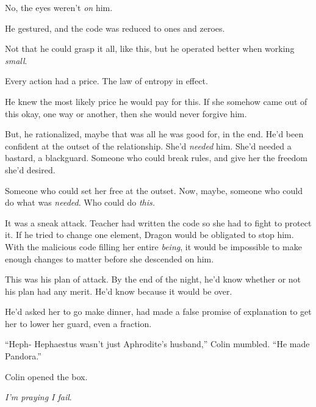 No, the eyes weren't \emph{on} him.



He gestured, and the code was reduced to ones and zeroes.



Not that he could grasp it all, like this, but he operated better when working \emph{small}.



Every action had a price.  The law of entropy in effect.



He knew the most likely price he would pay for this.  If she somehow came out of this okay, one way or another, then she would never forgive him.



But, he rationalized, maybe that was all he was good for, in the end.  He'd been confident at the outset of the relationship.  She'd \emph{needed} him.  She'd needed a bastard, a blackguard.  Someone who could break rules, and give her the freedom she'd desired.



Someone who could set her free at the outset.  Now, maybe, someone who could do what was \emph{needed}.  Who could do \emph{this.}



It was a sneak attack.  Teacher had written the code so she had to fight to protect it.  If he tried to change one element, Dragon would be obligated to stop him.  With the malicious code filling her entire \emph{being}, it would be impossible to make enough changes to matter before she descended on him.



This was his plan of attack.  By the end of the night, he'd know whether or not his plan had any merit.  He'd know because it would be over.



He'd asked her to go make dinner, had made a false promise of explanation to get her to lower her guard, even a fraction.



``Heph- Hephaestus wasn't just Aphrodite's husband,'' Colin mumbled.  ``He made Pandora.''



Colin opened the box.



\emph{I'm praying I fail}.



\blacksquare



